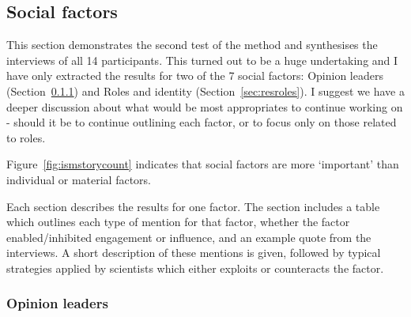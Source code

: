 \subsection{Social factors}\label{sec:ressocial}

This section demonstrates the second test of the method and synthesises the interviews of all 14 participants. This turned out to be a huge undertaking and I have only extracted the results for two of the 7 social factors: Opinion leaders (Section~\ref{sec:resopinionleaders}) and Roles and identity (Section~\ref{sec:resroles}). I suggest we have a deeper discussion about what would be most appropriates to continue working on - should it be to continue outlining each factor, or to focus only on those related to roles.

Figure~\ref{fig:ismstorycount} indicates that social factors are more `important' than individual or material factors.

Each section describes the results for one factor. The section includes a table which outlines each type of mention for that factor, whether the factor enabled/inhibited engagement or influence, and an example quote from the interviews. A short description of these mentions is given, followed by typical strategies applied by scientists which either exploits or counteracts the factor.

\subsubsection{Opinion leaders}\label{sec:resopinionleaders}

